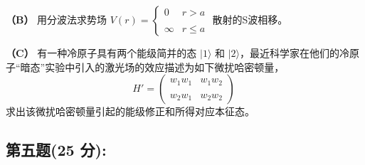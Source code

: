 \textbf{（B）} 用分波法求势场 $V(r) = 
\begin{cases}
 0 & r > a \\\\
\infty & r \leq a 
\end{cases}$ 散射的S波相移。

\textbf{（C）} 有一种冷原子具有两个能级简并的态 $|1\rangle$ 和 $|2\rangle$，最近科学家在他们的冷原子“暗态”实验中引入的激光场的效应描述为如下微扰哈密顿量，
$$H' = \begin{pmatrix} w_1 w_1 & w_1 w_2 \\\\ w_2 w_1 & w_2 w_2\end{pmatrix}~$$
求出该微扰哈密顿量引起的能级修正和所得对应本征态。
\subsection{第五题(25 分):}
